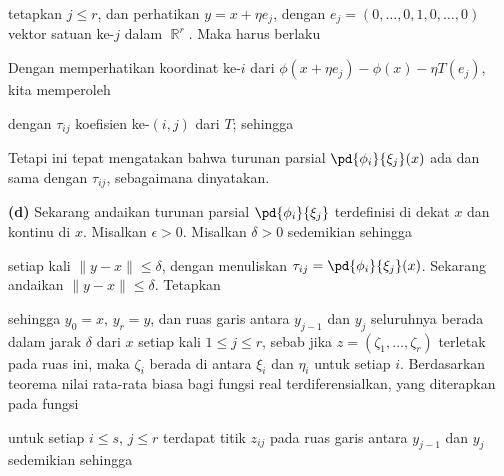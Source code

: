 {\noindent tetapkan $j\le r$, dan perhatikan $y=x+\eta e_j$, dengan
$e_j=(0,\ldots,0,1,0,\ldots,0)$ vektor satuan ke-$j$ dalam $\BbbR^r$.
Maka harus berlaku


\noindent Dengan memperhatikan koordinat ke-$i$ dari
$\phi(x+\eta e_j)-\phi(x)-\eta T(e_j)$, kita memperoleh



\noindent dengan $\tau_{ij}$ koefisien ke-$(i,j)$ dari $T$; sehingga


\noindent Tetapi ini tepat mengatakan bahwa turunan parsial
$\pd{\phi_i}{\xi_j}(x)$ ada dan sama dengan $\tau_{ij}$, sebagaimana
dinyatakan.

\medskip

{\bf (d)} Sekarang andaikan turunan parsial $\pd{\phi_i}{\xi_j}$
terdefinisi di dekat $x$ dan kontinu di $x$. Misalkan $\epsilon>0$.
Misalkan $\delta>0$ sedemikian sehingga


\noindent setiap kali $\|y-x\|\le\delta$, dengan menuliskan
$\tau_{ij}=\pd{\phi_i}{\xi_j}(x)$.   Sekarang andaikan
$\|y-x\|\le\delta$.   Tetapkan



\noindent sehingga $y_0=x$, $y_r=y$, dan ruas garis antara $y_{j-1}$ dan
$y_{j}$ seluruhnya berada dalam jarak $\delta$ dari $x$ setiap kali
$1\le j\le r$, sebab jika $z=(\zeta_1,\ldots,\zeta_r)$ terletak pada
ruas ini, maka $\zeta_i$ berada di antara $\xi_i$ dan $\eta_i$ untuk
setiap $i$. Berdasarkan teorema nilai rata-rata biasa bagi fungsi real
terdiferensialkan, yang diterapkan pada fungsi


\noindent untuk setiap $i\le s$, $j\le r$ terdapat titik $z_{ij}$ pada
ruas garis antara $y_{j-1}$ dan $y_j$ sedemikian sehingga


}
